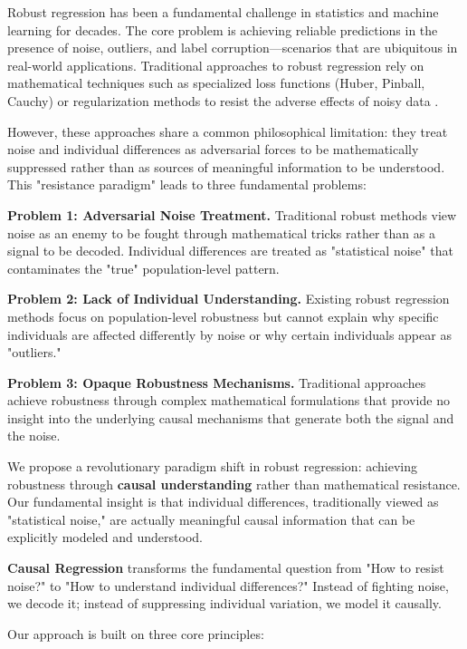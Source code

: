 \documentclass[letterpaper]{article} %
\begin{document}
Robust regression has been a fundamental challenge in statistics and machine learning for decades. The core problem is achieving reliable predictions in the presence of noise, outliers, and label corruption—scenarios that are ubiquitous in real-world applications. Traditional approaches to robust regression rely on mathematical techniques such as specialized loss functions (Huber, Pinball, Cauchy) or regularization methods to resist the adverse effects of noisy data \cite{hastie2009elements}.

However, these approaches share a common philosophical limitation: they treat noise and individual differences as adversarial forces to be mathematically suppressed rather than as sources of meaningful information to be understood. This "resistance paradigm" leads to three fundamental problems:

\textbf{Problem 1: Adversarial Noise Treatment.} Traditional robust methods view noise as an enemy to be fought through mathematical tricks rather than as a signal to be decoded. Individual differences are treated as "statistical noise" that contaminates the "true" population-level pattern.

\textbf{Problem 2: Lack of Individual Understanding.} Existing robust regression methods focus on population-level robustness but cannot explain why specific individuals are affected differently by noise or why certain individuals appear as "outliers."

\textbf{Problem 3: Opaque Robustness Mechanisms.} Traditional approaches achieve robustness through complex mathematical formulations that provide no insight into the underlying causal mechanisms that generate both the signal and the noise.

We propose a revolutionary paradigm shift in robust regression: achieving robustness through \textbf{causal understanding} rather than mathematical resistance. Our fundamental insight is that individual differences, traditionally viewed as "statistical noise," are actually meaningful causal information that can be explicitly modeled and understood.

\textbf{Causal Regression} transforms the fundamental question from "How to resist noise?" to "How to understand individual differences?" Instead of fighting noise, we decode it; instead of suppressing individual variation, we model it causally.

Our approach is built on three core principles:
\end{document}
